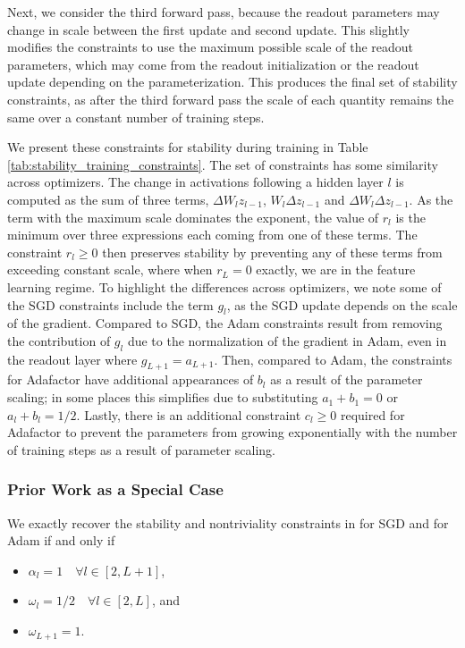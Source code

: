 \documentclass{article}
\theoremstyle{plain}
\theoremstyle{definition}
\theoremstyle{remark}
\begin{document}
Next, we consider the third forward pass, because the readout parameters may change in scale between the first update and second update. This slightly modifies the constraints to use the maximum possible scale of the readout parameters, which may come from the readout initialization or the readout update depending on the parameterization. This produces the final set of stability constraints, as after the third forward pass the scale of each quantity remains the same over a constant number of training steps.

We present these constraints for stability during training in Table \ref{tab:stability_training_constraints}. The set of constraints has some similarity across optimizers. The change in activations following a hidden layer $l$ is computed as the sum of three terms, $\Delta W_l z_{l-1}$, $W_l \Delta z_{l-1}$ and $\Delta W_l \Delta z_{l-1}$. As the term with the maximum scale dominates the exponent, the value of $r_l$ is the minimum over three expressions each coming from one of these terms. The constraint $r_l \geq 0$ then preserves stability by preventing any of these terms from exceeding constant scale, where when $r_L = 0$ exactly, we are in the feature learning regime. To highlight the differences across optimizers, we note some of the SGD constraints include the term $g_l$, as the SGD update depends on the scale of the gradient. Compared to SGD, the Adam constraints result from removing the contribution of $g_l$ due to the normalization of the gradient in Adam, even in the readout layer where $g_{L+1} = a_{L+1}$. Then, compared to Adam, the constraints for Adafactor have additional appearances of $b_l$ as a result of the parameter scaling; in some places this simplifies due to substituting $a_1 + b_1 = 0$ or $a_l + b_l = 1/2$. Lastly, there is an additional constraint $c_{l} \geq 0$ required for Adafactor to prevent the parameters from growing exponentially with the number of training steps as a result of parameter scaling.

\subsubsection{Prior Work as a Special Case}
We exactly recover the stability and nontriviality constraints in \citet{yang2021tensoriv} for SGD and \citet{yang2023tensorivb} for Adam\footnotemark{} if and only if
\begin{itemize}
    \item $\alpha_l = 1 \quad \forall l \in [2, L+1]$,
    \item $\omega_l = 1/2 \quad \forall l \in [2, L]$, \quad and
    \item $\omega_{L+1} = 1$.
\end{itemize}
\end{document}
